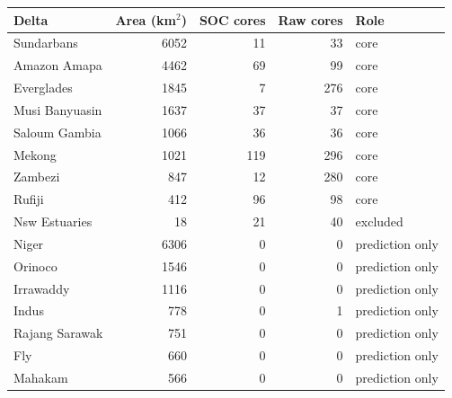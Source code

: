\begin{tabular}{lrrrl}
\toprule
Delta & Area (km$^2$) & SOC cores & Raw cores & Role \\
\midrule
Sundarbans & 6052 & 11 & 33 & core \\
Amazon Amapa & 4462 & 69 & 99 & core \\
Everglades & 1845 & 7 & 276 & core \\
Musi Banyuasin & 1637 & 37 & 37 & core \\
Saloum Gambia & 1066 & 36 & 36 & core \\
Mekong & 1021 & 119 & 296 & core \\
Zambezi & 847 & 12 & 280 & core \\
Rufiji & 412 & 96 & 98 & core \\
Nsw Estuaries & 18 & 21 & 40 & excluded \\
Niger & 6306 & 0 & 0 & prediction only \\
Orinoco & 1546 & 0 & 0 & prediction only \\
Irrawaddy & 1116 & 0 & 0 & prediction only \\
Indus & 778 & 0 & 1 & prediction only \\
Rajang Sarawak & 751 & 0 & 0 & prediction only \\
Fly & 660 & 0 & 0 & prediction only \\
Mahakam & 566 & 0 & 0 & prediction only \\
\bottomrule
\end{tabular}
